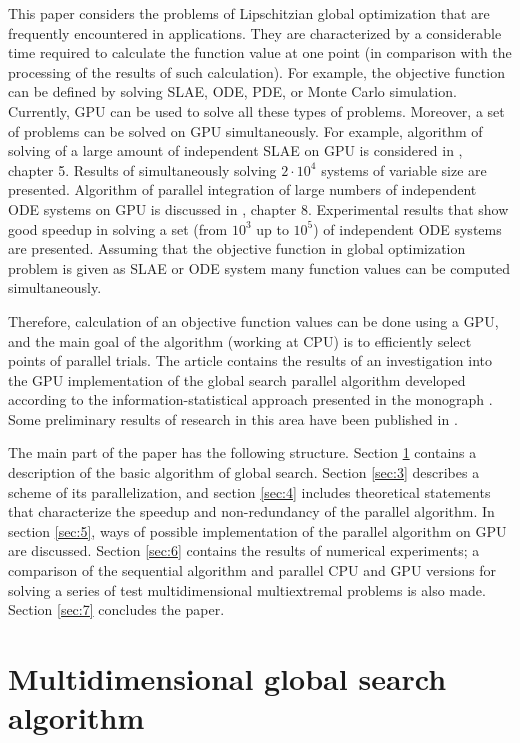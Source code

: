 \documentclass[smallcondensed]{svjour3}     %
\begin{document}
This paper considers the problems of Lipschitzian global optimization that are frequently encountered in applications. They are characterized by a considerable time required to calculate the function value at one point (in comparison with the processing of the results of such calculation). For example, the objective function can be defined by solving SLAE, ODE, PDE, or Monte Carlo simulation. Currently, GPU can be used to solve all these types of problems. 
Moreover, a set of problems can be solved on GPU simultaneously. For example, algorithm of solving of a large amount of independent SLAE on GPU is considered in \cite{RefKindratenko}, chapter 5. Results of simultaneously solving $2 \cdot 10^4$ systems of variable size are presented. Algorithm of parallel integration of large numbers of independent ODE systems on GPU is discussed in \cite{RefKindratenko}, chapter 8. Experimental results that show good speedup in solving a set (from $10^3$ up to $10^5$) of independent ODE systems are presented. Assuming that the objective function in global optimization problem is given as SLAE or ODE system many function values can be computed simultaneously.

Therefore, calculation of an objective function values can be done using a GPU, and the main goal of the algorithm	 (working at CPU) is to efficiently select points of parallel trials. The article contains the results of an investigation into the GPU implementation of the global search parallel algorithm developed according to the information-statistical approach presented in the monograph \cite{RefStrongin2000}. Some preliminary results of research in this area have been published in \cite{RefLebedevBarkalov}.

The main part of the paper has the following structure. Section \ref{sec:2} contains a description of the basic algorithm of global search. Section \ref{sec:3} describes a scheme of its parallelization, and section \ref{sec:4} includes theoretical statements that characterize the speedup and non-redundancy of the parallel algorithm. In section \ref{sec:5}, ways of possible implementation of the parallel algorithm on GPU are discussed. Section \ref{sec:6} contains the results of numerical experiments; a comparison of the sequential algorithm and parallel CPU and GPU versions for solving a series of test multidimensional multiextremal problems is also made. Section \ref{sec:7} concludes the paper.

\section{Multidimensional global search algorithm} \label{sec:2}
\end{document}
